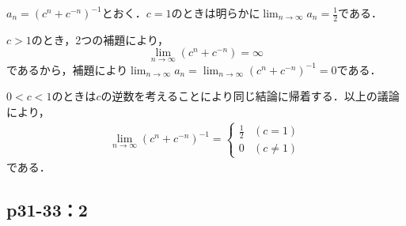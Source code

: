 \documentclass[uplatex,dvipdfmx,a4paper,10pt,fleqn]{jsarticle}
\begin{document}
\begin{tleftbar}
    $a_n = (c^n +c^{-n})^{-1}$とおく．$c=1$のときは明らかに$\lim_{n \to \infty} a_n =\frac{1}{2}$である．

    $c>1$のとき，2つの補題により，
    \[
        \lim_{n \to \infty} (c^n + c^{-n}) = \infty
    \]
    であるから，補題により$\lim_{n \to \infty} a_n = \lim_{n \to \infty} (c^n +c^{-n})^{-1} =0$である．

    $0<c<1$のときは$c$の逆数を考えることにより同じ結論に帰着する．以上の議論により，
    \begin{align*}
        \lim_{n \to \infty} (c^n +c^{-n})^{-1} =
        \begin{cases}
            \frac{1}{2}&(c=1)\\
            0 & (c \ne 1)
        \end{cases}
    \end{align*}
    である．
\end{tleftbar}


\subsection*{p31-33：2}
\end{document}

